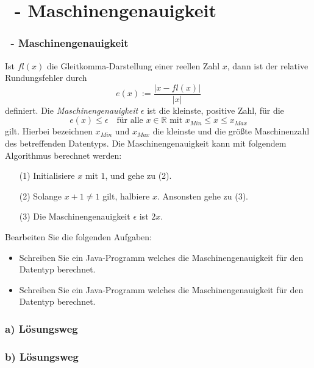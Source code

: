 \def\stitle{\theexercise\ - Maschinengenauigkeit}
\section{\stitle}

\begin{frame}[t]%
    \frametitle{\stitle}
\medskip

Ist $fl(x)$ die Gleitkomma-Darstellung einer reellen Zahl $x$, dann ist der relative Rundungsfehler durch \[ e(x) := \frac{\lvert x - fl(x) \rvert }{\lvert x \rvert}  \] definiert.
Die \emph{Maschinengenauigkeit} $\epsilon$ ist die kleinste, positive Zahl, für die \[ e(x) \leq \epsilon \quad\text{für alle } x \in \mathbb{R} \text{ mit } x_{Min} \leq x \leq x_{Max} \] gilt.
Hierbei bezeichnen $x_{Min}$ und $x_{Max}$ die kleinste und die größte Maschinenzahl des betreffenden Datentyps.
Die Maschinengenauigkeit kann mit folgendem Algorithmus berechnet werden:
\begin{center}
\begin{minipage}{0.8\textwidth}
\begin{enumerate}
\item[(1)] Initialisiere $x$ mit $1$, und gehe zu (2).
\item[(2)] Solange $x + 1 \neq 1$ gilt, halbiere $x$. Ansonsten gehe zu (3).
\item[(3)] Die Maschinengenauigkeit $\epsilon$ ist $2x$.
\end{enumerate}
\end{minipage}
\end{center}
\bigskip
Bearbeiten Sie die folgenden Aufgaben:
\begin{itemize}
\item Schreiben Sie ein Java-Programm welches die Maschinengenauigkeit für den Datentyp  berechnet.
\item Schreiben Sie ein Java-Programm welches die Maschinengenauigkeit für den Datentyp  berechnet.
\end{itemize}

\end{frame}

\begin{frame}[fragile]%
 \frametitle{a) L\"osungsweg}%

\begin{center}

\end{center}
\end{frame}

\begin{frame}[fragile]%
 \frametitle{b) L\"osungsweg}%

\begin{center}

\end{center}
\end{frame}
